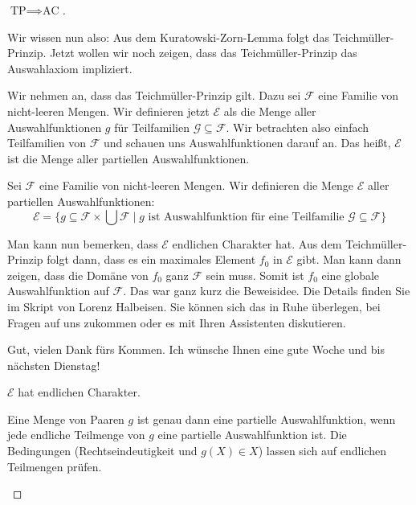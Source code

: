 \begin{proof}[$\text{TP} \implies \text{AC}$]
\begin{spoken-clean}[01:05:00 - 01:07:30]
Wir wissen nun also: Aus dem Kuratowski-Zorn-Lemma folgt das Teichmüller-Prinzip. Jetzt wollen wir noch zeigen, dass das Teichmüller-Prinzip das Auswahlaxiom impliziert.

Wir nehmen an, dass das Teichmüller-Prinzip gilt. Dazu sei $\mathcal{F}$ eine Familie von nicht-leeren Mengen. Wir definieren jetzt $\mathcal{E}$ als die Menge aller Auswahlfunktionen $g$ für Teilfamilien $\mathcal{G} \subseteq \mathcal{F}$. Wir betrachten also einfach Teilfamilien von $\mathcal{F}$ und schauen uns Auswahlfunktionen darauf an. Das heißt, $\mathcal{E}$ ist die Menge aller partiellen Auswahlfunktionen.
\end{spoken-clean}

\begin{math-stroke}
Sei $\mathcal{F}$ eine Familie von nicht-leeren Mengen.
Wir definieren die Menge $\mathcal{E}$ aller partiellen Auswahlfunktionen:
\[
\mathcal{E} = \{ g \subseteq \mathcal{F} \times \bigcup \mathcal{F} \mid g \text{ ist Auswahlfunktion für eine Teilfamilie } \mathcal{G} \subseteq \mathcal{F} \}
\]
\end{math-stroke}

\begin{spoken-clean}[01:07:30 - 01:10:00]
Man kann nun bemerken, dass $\mathcal{E}$ endlichen Charakter hat. Aus dem Teichmüller-Prinzip folgt dann, dass es ein maximales Element $f_0$ in $\mathcal{E}$ gibt. Man kann dann zeigen, dass die Domäne von $f_0$ ganz $\mathcal{F}$ sein muss. Somit ist $f_0$ eine globale Auswahlfunktion auf $\mathcal{F}$. Das war ganz kurz die Beweisidee. Die Details finden Sie im Skript von Lorenz Halbeisen. Sie können sich das in Ruhe überlegen, bei Fragen auf uns zukommen oder es mit Ihren Assistenten diskutieren. 

Gut, vielen Dank fürs Kommen. Ich wünsche Ihnen eine gute Woche und bis nächsten Dienstag!
\end{spoken-clean}

\begin{math-stroke}
\begin{claim}
$\mathcal{E}$ hat endlichen Charakter.
\end{claim}
\begin{short-proof}
Eine Menge von Paaren $g$ ist genau dann eine partielle Auswahlfunktion, wenn jede endliche Teilmenge von $g$ eine partielle Auswahlfunktion ist. Die Bedingungen (Rechtseindeutigkeit und $g(X) \in X$) lassen sich auf endlichen Teilmengen prüfen.
\end{short-proof}


\end{math-stroke}
\end{proof}
